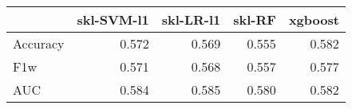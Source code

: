 \begin{tabular}{lrrrr}
\toprule
{} &  skl-SVM-l1 &  skl-LR-l1 &  skl-RF &  xgboost \\
\midrule
Accuracy &       0.572 &      0.569 &   0.555 &    0.582 \\
F1w      &       0.571 &      0.568 &   0.557 &    0.577 \\
AUC      &       0.584 &      0.585 &   0.580 &    0.582 \\
\bottomrule
\end{tabular}
